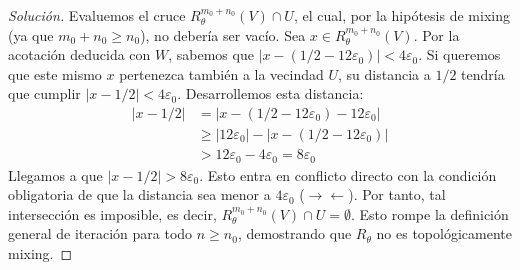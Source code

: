 \begin{proof}[Solución]
	Evaluemos el cruce $R_\theta^{m_0+n_0}(V) \cap U$, el cual, por la hipótesis de mixing (ya que $m_0+n_0 \ge n_0$), no debería ser vacío.
	Sea $x \in R_\theta^{m_0+n_0}(V)$. Por la acotación deducida con $W$, sabemos que $|x - (1/2 - 12\varepsilon_0)| < 4\varepsilon_0$.
	Si queremos que este mismo $x$ pertenezca también a la vecindad $U$, su distancia a $1/2$ tendría que cumplir $|x - 1/2| < 4\varepsilon_0$. Desarrollemos esta distancia:
	\begin{align*}
		|x - 1/2| &= |x - (1/2 - 12\varepsilon_0) - 12\varepsilon_0| \\
		&\ge |12\varepsilon_0| - |x - (1/2 - 12\varepsilon_0)| \\
		&> 12\varepsilon_0 - 4\varepsilon_0 = 8\varepsilon_0
	\end{align*}
	Llegamos a que $|x - 1/2| > 8\varepsilon_0$. Esto entra en conflicto directo con la condición obligatoria de que la distancia sea menor a $4\varepsilon_0$ ($\rightarrow \leftarrow$).
	Por tanto, tal intersección es imposible, es decir, $R_\theta^{m_0+n_0}(V) \cap U = \emptyset$. Esto rompe la definición general de iteración para todo $n \ge n_0$, demostrando que $R_\theta$ no es topológicamente mixing.
\end{proof}